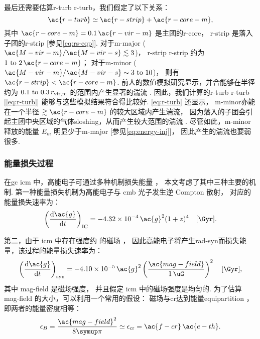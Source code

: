 最后还需要估算\acl{r-turb} \ac{r-turb}，我们假定了以下关系：
\begin{equation}
  \label{eq:r-turb}
  \ac{r-turb} \simeq \ac{r-strip} + \ac{r-core-m} ,
\end{equation}
其中
$\ac{r-core-m} = 0.1 \,\ac{r-vir-m}$ 是主团的\acl{r-core}，
\ac{r-strip} 是落入子团的\acl{r-strip} [参见\autoref{eq:rs-eqp}].
对于\ac{m-major} ($\ac{M-vir-m} / \ac{M-vir-s} \lesssim 3$)，
\acl{r-strip} \ac{r-strip} 约为 $\numrange{1}{2} \,\ac{r-core-m}$；
对于\ac{m-minor} ($\ac{M-vir-m} / \ac{M-vir-s} \sim \numrange{3}{10}$)，
则有 $\ac{r-strip} < \ac{r-core-m}$.
前人的数值模拟研究显示，并合能够在半径约为 $\numrange{0.1}{0.3} \,r_{\R{vir,m}}$
的范围内产生显著的湍流 \cite{vazza2011,vazza2012,miniati2015ss}.
因此，我们计算的\acl{r-turb} \ac{r-turb} [\autoref{eq:r-turb}]
能够与这些模拟结果符合得比较好.
\autoref{eq:r-turb} 还显示，
\ac{m-minor}亦能在一个半径 $\gtrsim \ac{r-core-m}$ 的较大区域内产生湍流，
因为落入的子团会引起主团中央区域的气体\ac{sloshing}，从而产生较大范围的湍流
\cite{vazza2012}.
尽管如此，\ac{m-minor}释放的能量 $E_m$ 明显少于\ac{m-major}
[参见\autoref{eq:energy-inj}]，
因此产生的湍流也要弱很多.

\subsubsection{能量损失过程}

在\ac{gc} \ac{icm} 中，高能电子可通过多种机制损失能量 \cite{sarazin1999}，
本文考虑了其中三种主要的机制.
第一种能量损失机制为高能电子与 \ac{cmb} 光子发生逆 Compton 散射，
对应的能量损失速率为：
\begin{equation}
  \label{eq:eloss-ic}
  \left( \diff{\ac{g}}{t} \right)_{\R{IC}} =
    \num{-4.32e-4} \,\ac{g}^2 (1+z)^4
    \quad [\si{\per\Gyr}] .
\end{equation}

第二，由于 \ac{icm} 中存在强度约 \si{\uG} 的磁场 \cite{govoni2004,ryu2008}，
因此高能电子将产生\ac{rad-syn}而损失能量，该过程的能量损失速率为：
\begin{equation}
  \label{eq:eloss-syn}
  \left( \diff{\ac{g}}{t} \right)_{\R{syn}} =
    \num{-4.10e-5} \,\ac{g}^2
    \left( \frac{\ac{mag-field}}{\SI{1}{\uG}} \right)^2
    \quad [\si{\per\Gyr}] ,
\end{equation}
其中 \ac{mag-field} 是磁场强度，
并且假定 \ac{icm} 中的磁场强度是均匀的.
为了估算 \ac{mag-field} 的大小，可以利用一个常用的假设：
磁场与\ac{cr}达到能量\ac{equipartition} \cite{beck2005}，
即两者的能量密度相等：
\begin{equation}
  \epsilon_B = \frac{\ac{mag-field}^2}{8\Cpi}
    \simeq \epsilon_{\R{cr}} = \ac{f-cr}\,\ac{e-th} .
\end{equation}

